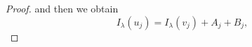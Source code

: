 \documentclass[11pt]{amsart}
\numberwithin{equation}{section} %
\theoremstyle{definition}
\def\R{\mathbb{R}}
\begin{document}
\begin{proof}
	\noindent and then we obtain
	$$I_{\lambda}(u_j) = I_{\lambda}(v_j)+A_j+B_j,$$

\end{proof}
\end{document}
